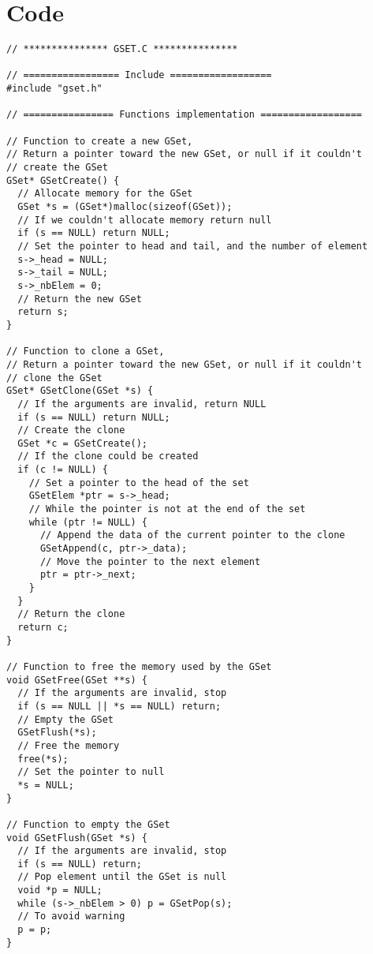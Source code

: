 \documentclass[12pt, a4paper]{article}
\begin{document}
\section{Code}

\begin{scriptsize}
\begin{ttfamily}
\begin{lstlisting}
// *************** GSET.C ***************

// ================= Include ==================
#include "gset.h"

// ================ Functions implementation ==================

// Function to create a new GSet,
// Return a pointer toward the new GSet, or null if it couldn't
// create the GSet
GSet* GSetCreate() {
  // Allocate memory for the GSet
  GSet *s = (GSet*)malloc(sizeof(GSet));
  // If we couldn't allocate memory return null
  if (s == NULL) return NULL;
  // Set the pointer to head and tail, and the number of element
  s->_head = NULL;
  s->_tail = NULL;
  s->_nbElem = 0;
  // Return the new GSet
  return s;
}

// Function to clone a GSet,
// Return a pointer toward the new GSet, or null if it couldn't
// clone the GSet
GSet* GSetClone(GSet *s) {
  // If the arguments are invalid, return NULL
  if (s == NULL) return NULL;
  // Create the clone
  GSet *c = GSetCreate();
  // If the clone could be created
  if (c != NULL) {
    // Set a pointer to the head of the set
    GSetElem *ptr = s->_head;
    // While the pointer is not at the end of the set
    while (ptr != NULL) {
      // Append the data of the current pointer to the clone
      GSetAppend(c, ptr->_data);
      // Move the pointer to the next element
      ptr = ptr->_next;
    }
  }
  // Return the clone
  return c;
}

// Function to free the memory used by the GSet
void GSetFree(GSet **s) {
  // If the arguments are invalid, stop
  if (s == NULL || *s == NULL) return;
  // Empty the GSet
  GSetFlush(*s);
  // Free the memory
  free(*s);
  // Set the pointer to null
  *s = NULL;
}

// Function to empty the GSet
void GSetFlush(GSet *s) {
  // If the arguments are invalid, stop
  if (s == NULL) return;
  // Pop element until the GSet is null
  void *p = NULL;
  while (s->_nbElem > 0) p = GSetPop(s);
  // To avoid warning
  p = p;
}


\end{lstlisting}
\end{ttfamily}
\end{scriptsize}
\end{document}
